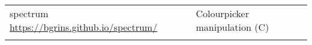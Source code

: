 \documentclass[longauth, final]{aa}
\begin{document}
\begin{table*}[ht]
\begin{tabularx}{0.95\textwidth}{XX}
spectrum \newline \small{\url{https://bgrins.github.io/spectrum/}} & Colourpicker manipulation (C)\\    
    \noalign{\smallskip}\hline    \noalign{\smallskip}

\end{tabularx}
\end{table*}
\end{document}
